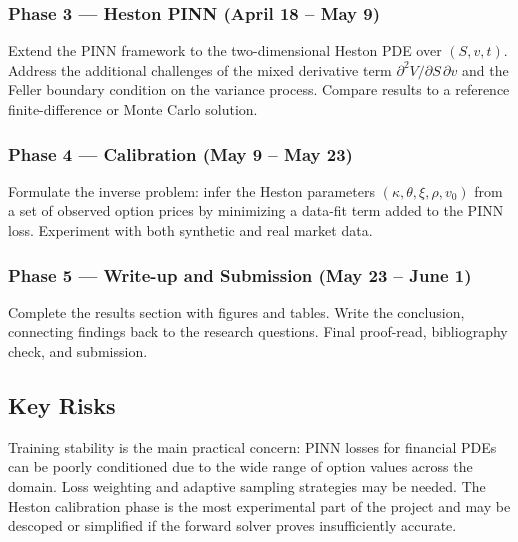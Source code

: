 \subsubsection*{Phase 3 --- Heston PINN (April 18 -- May 9)}

Extend the PINN framework to the two-dimensional Heston PDE over $(S, v, t)$. Address the additional challenges of the mixed derivative term $\partial^2 V/\partial S\,\partial v$ and the Feller boundary condition on the variance process. Compare results to a reference finite-difference or Monte Carlo solution.

\subsubsection*{Phase 4 --- Calibration (May 9 -- May 23)}

Formulate the inverse problem: infer the Heston parameters $(\kappa, \theta, \xi, \rho, v_0)$ from a set of observed option prices by minimizing a data-fit term added to the PINN loss. Experiment with both synthetic and real market data.

\subsubsection*{Phase 5 --- Write-up and Submission (May 23 -- June 1)}

Complete the results section with figures and tables. Write the conclusion, connecting findings back to the research questions. Final proof-read, bibliography check, and submission.

\subsection*{Key Risks}

Training stability is the main practical concern: PINN losses for financial PDEs can be poorly conditioned due to the wide range of option values across the domain. Loss weighting and adaptive sampling strategies may be needed. The Heston calibration phase is the most experimental part of the project and may be descoped or simplified if the forward solver proves insufficiently accurate.
